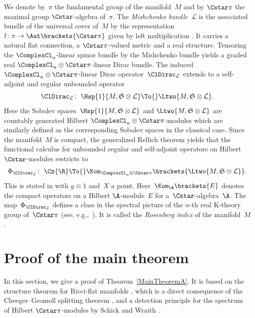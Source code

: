 \documentclass[10pt,a4paper]{amsart}
\numberwithin{equation}{section}
\newcommand{\ClSpinBdl}{\mathfrak{S}}
\newcommand{\ClDL}{\ClDirac_{\mathcal{L}}}
\begin{document}
We denote by~$\pi$ the fundamental group of the manifold~$M$ and by $\Cstar \pi$ the maximal group $\Cstar$-algebra of~$\pi$. The \textit{Mishchenko bundle}~$\mathcal{L}$ is the associated bundle of the universal cover of~$M$ by the representation $l \colon \pi \to \Aut\brackets{\Cstar \pi}$ given by left multiplication \cite{Mishchenko1980}. It carries a natural flat connection, a $\Cstar \pi$-valued metric and a real structure. Tensoring the $\ComplexCl_n$-linear spinor bundle by the Mishchenko bundle yields a graded real $\ComplexCl_n\otimes \Cstar \pi$-linear Dirac bundle. The induced~${\ComplexCl_n \otimes \Cstar \pi}$-linear Dirac operator~$\ClDirac_{\mathcal{L}}$ extends to a self-adjoint and regular unbounded operator
\[
 \ClDL\colon\ \Hsp{1}{M,\ClSpinBdl\otimes \mathcal{L}} \To{} \Ltwo{M,\ClSpinBdl\otimes \mathcal{L}}.
\]
Here the Sobolev spaces~$\Hsp{1}{M,\ClSpinBdl\otimes \mathcal{L}}$ and $\Ltwo{M,\ClSpinBdl\otimes \mathcal{L}}$ are countably generated Hilbert $\ComplexCl_n\otimes \Cstar \pi$-modules which are similarly defined as the corresponding Sobolev spaces in the classical case. Since the manifold~$M$ is compact, the generalized Rellich theorem \cite[Theorem~2.33]{Ebert2016} yields that the functional calculus for unbounded regular and self-adjoint operators on Hilbert $\Cstar$-modules \cite[Theorem~1.19]{Ebert2016} restricts to
\begin{gather} \label{FunctionalCalculus}
 \Phi_{\ClDirac_{\mathcal{L}}}\colon\ \Cz{\R} \To{} \Kom_{\ComplexCl_n\otimes \Cstar \pi} \brackets{\Ltwo{M,\ClSpinBdl\otimes \mathcal{L}}}.
\end{gather}
This is stated in \cite[Proposition~2.34]{Ebert2016} with $g\equiv 1$ and~$X$ a point. Here~$\Kom_{\A}\brackets{E}$ denotes the compact operators on a Hilbert $\A$-module~$E$ for a~$\Cstar$-algebra~$\A$. The map~$\Phi_{\ClDirac_{\mathcal{L}}}$ defines a class in the spectral picture of the $n$-th real K-theory group of~$\Cstar \pi$ (see, e.g.,~\cite[Lecture 13]{Roe}). It is called the \textit{Rosenberg index} of the manifold~$M$.

\section{Proof of the main theorem} \label{SectionProofThmA}

In this section, we give a proof of Theorem~\ref{MainTheoremA}. It is based on the structure theorem for Ricci-flat manifolds \cite[Theorem~4.5]{Fischer1975}, which is a direct consequence of the Cheeger--Gromoll splitting theorem \cite{Cheeger1971}, and a detection principle for the spectrum of Hilbert $\Cstar \pi$-modules by Schick and Wraith \cite{Schick2021a}.
\end{document}
